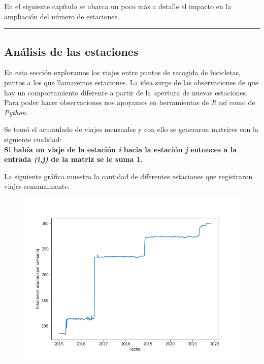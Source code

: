 \documentclass[
]{article}
\begin{document}
En el siguiente capítulo se abarca un poco más a detalle el impacto en
la ampliación del número de estaciones.

\begin{center}\rule{0.5\linewidth}{0.5pt}\end{center}

\newpage
\hypertarget{anuxe1lisis-de-las-estaciones}{%
\subsection{Análisis de las
estaciones}\label{anuxe1lisis-de-las-estaciones}}

En esta sección exploramos los viajes entre puntos de recogida de
bicicletas, puntos a los que llamaremos estaciones. La idea surge de las
observaciones de que hay un comportamiento diferente a partir de la
apertura de nuevas estaciones. Para poder hacer observaciones nos
apoyamos en herramientas de \emph{R} así como de \emph{Python}.

Se tomó el acumulado de viajes mensuales y con ello se generaron
matrices con la siguiente cualidad:\\
\textbf{Si había un viaje de la estación \emph{i} hacia la estación
\emph{j} entonces a la entrada \emph{(i,j)} de la matriz se le suma 1.}

La siguiente gráfica muestra la cantidad de diferentes estaciones que
registraron viajes semanalmente.

\begin{figure}
\centering
\includegraphics{../plots/stations_weekly.png}
\end{figure}
\end{document}
